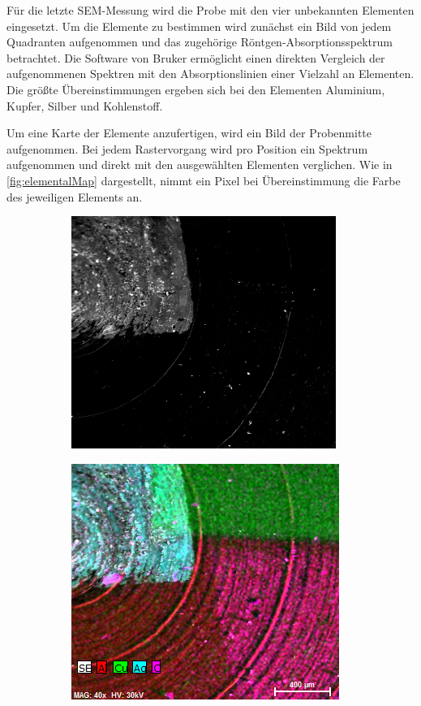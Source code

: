 	Für die letzte SEM-Messung wird die Probe mit den vier unbekannten Elementen eingesetzt.
	Um die Elemente zu bestimmen wird zunächst ein Bild von jedem Quadranten aufgenommen und das zugehörige Röntgen-Absorptionsspektrum betrachtet.
	Die Software von Bruker ermöglicht einen direkten Vergleich der aufgenommenen Spektren mit den Absorptionslinien einer Vielzahl an Elementen.
	Die größte Übereinstimmungen ergeben sich bei den Elementen Aluminium, Kupfer, Silber und Kohlenstoff.

	Um eine Karte der Elemente anzufertigen, wird ein Bild der Probenmitte aufgenommen.
	Bei jedem Rastervorgang wird pro Position ein Spektrum aufgenommen und direkt mit den ausgewählten Elementen verglichen.
	Wie in \cref{fig:elementalMap} dargestellt, nimmt ein Pixel bei Übereinstimmung die Farbe des jeweiligen Elements an.
	\begin{figure}[H]
		\centering
		\begin{subfigure}[c]{.45\textwidth}
			\centering
			\includegraphics[width=.8\textwidth]{raw/SEM/Map4ProbenExt}
			\subcaption{}
			\label{fig:farbloseMap}
		\end{subfigure}
		\begin{subfigure}[c]{.45\textwidth}
			\centering
			\includegraphics[width=.8\textwidth]{raw/SEM/Mapdaten4Proben}

\end{subfigure}
\end{figure}

